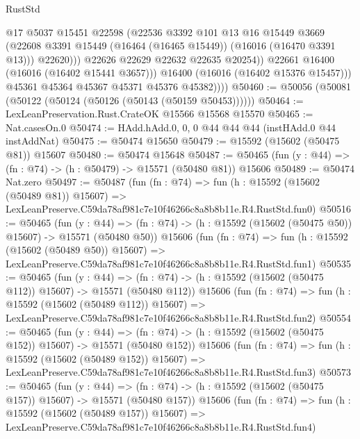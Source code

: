 \begin{lexlean}{RustStd}
\begin{coremodule}
                        @17
                        @5037
                        @15451
                        @22598
                        (@22536
                          @3392
                          @101
                          @13
                          @16
                          @15449
                          @3669
                          (@22608 @3391 @15449 (@16464 (@16465 @15449)) (@16016 (@16470 @3391 @13)))
                          @22620)))
                    @22626
                    @22629
                    @22632
                    @22635
                    @20254))
                @22661
                @16400
                (@16016 (@16402 @15441 @3657)))
              @16400
              (@16016 (@16402 @15376 @15457)))
            @45361
            @45364
            @45367
            @45371
            @45376
            @45382))))
@50460 := @50056 (@50081 (@50122 (@50124 (@50126 (@50143 (@50159 @50453))))))
@50464 := LexLeanPreservation.Rust.CrateOK @15566 @15568 @15570
@50465 := Nat.casesOn.{0}
@50474 := HAdd.hAdd.{0, 0, 0} @44 @44 @44 (instHAdd.{0} @44 instAddNat)
@50475 := @50474 @15650
@50479 := @15592 (@15602 (@50475 @81)) @15607
@50480 := @50474 @15648
@50487 := @50465 (fun (y : @44) => (fn : @74) -> (h : @50479) -> @15571 (@50480 @81)) @15606
@50489 := @50474 Nat.zero
@50497 := @50487
    (fun (fn : @74) =>
    fun (h : @15592 (@15602 (@50489 @81)) @15607) =>
    LexLeanPreserve.C59da78af981c7e10f46266c8a8b8b11e.R4.RustStd.fun0)
@50516 := @50465
    (fun (y : @44) =>
    (fn : @74) -> (h : @15592 (@15602 (@50475 @50)) @15607) -> @15571 (@50480 @50))
    @15606
    (fun (fn : @74) =>
    fun (h : @15592 (@15602 (@50489 @50)) @15607) =>
    LexLeanPreserve.C59da78af981c7e10f46266c8a8b8b11e.R4.RustStd.fun1)
@50535 := @50465
    (fun (y : @44) =>
    (fn : @74) -> (h : @15592 (@15602 (@50475 @112)) @15607) -> @15571 (@50480 @112))
    @15606
    (fun (fn : @74) =>
    fun (h : @15592 (@15602 (@50489 @112)) @15607) =>
    LexLeanPreserve.C59da78af981c7e10f46266c8a8b8b11e.R4.RustStd.fun2)
@50554 := @50465
    (fun (y : @44) =>
    (fn : @74) -> (h : @15592 (@15602 (@50475 @152)) @15607) -> @15571 (@50480 @152))
    @15606
    (fun (fn : @74) =>
    fun (h : @15592 (@15602 (@50489 @152)) @15607) =>
    LexLeanPreserve.C59da78af981c7e10f46266c8a8b8b11e.R4.RustStd.fun3)
@50573 := @50465
    (fun (y : @44) =>
    (fn : @74) -> (h : @15592 (@15602 (@50475 @157)) @15607) -> @15571 (@50480 @157))
    @15606
    (fun (fn : @74) =>
    fun (h : @15592 (@15602 (@50489 @157)) @15607) =>
    LexLeanPreserve.C59da78af981c7e10f46266c8a8b8b11e.R4.RustStd.fun4)

\end{coremodule}
\end{lexlean}
